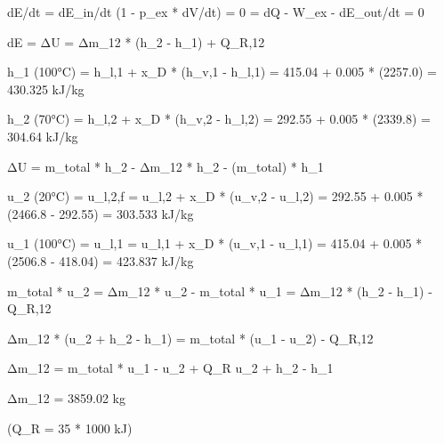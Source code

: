 dE/dt = dE_in/dt (1 - p_ex * dV/dt) = 0 = dQ - W_ex - dE_out/dt = 0  

dE = ΔU = Δm_12 * (h_2 - h_1) + Q_R,12  

h_1 (100°C) = h_l,1 + x_D * (h_v,1 - h_l,1)  
= 415.04 + 0.005 * (2257.0)  
= 430.325 kJ/kg  

h_2 (70°C) = h_l,2 + x_D * (h_v,2 - h_l,2)  
= 292.55 + 0.005 * (2339.8)  
= 304.64 kJ/kg  

ΔU = m_total * h_2 - Δm_12 * h_2 - (m_total) * h_1  

u_2 (20°C) = u_l,2,f = u_l,2 + x_D * (u_v,2 - u_l,2)  
= 292.55 + 0.005 * (2466.8 - 292.55)  
= 303.533 kJ/kg  

u_1 (100°C) = u_l,1 = u_l,1 + x_D * (u_v,1 - u_l,1)  
= 415.04 + 0.005 * (2506.8 - 418.04)  
= 423.837 kJ/kg  

m_total * u_2 = Δm_12 * u_2 - m_total * u_1 = Δm_12 * (h_2 - h_1) - Q_R,12  

Δm_12 * (u_2 + h_2 - h_1) = m_total * (u_1 - u_2) - Q_R,12  

Δm_12 = m_total * u_1 - u_2 + Q_R  
u_2 + h_2 - h_1  

Δm_12 = 3859.02 kg  

(Q_R = 35 * 1000 kJ)